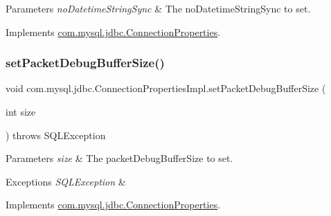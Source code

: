 \begin{DoxyParams}{Parameters}
{\em no\+Datetime\+String\+Sync} & The no\+Datetime\+String\+Sync to set. \\
\hline
\end{DoxyParams}


Implements \mbox{\hyperlink{interfacecom_1_1mysql_1_1jdbc_1_1_connection_properties_a01c8815660b50a6db2e6f89f796e3ee9}{com.\+mysql.\+jdbc.\+Connection\+Properties}}.

\mbox{\label{classcom_1_1mysql_1_1jdbc_1_1_connection_properties_impl_adbb96f1f13b761373e6fb46ac8cde113}} 
\subsubsection{\texorpdfstring{set\+Packet\+Debug\+Buffer\+Size()}{setPacketDebugBufferSize()}}
{\footnotesize\ttfamily void com.\+mysql.\+jdbc.\+Connection\+Properties\+Impl.\+set\+Packet\+Debug\+Buffer\+Size (\begin{DoxyParamCaption}\item[{int}]{size }\end{DoxyParamCaption}) throws S\+Q\+L\+Exception}


\begin{DoxyParams}{Parameters}
{\em size} & The packet\+Debug\+Buffer\+Size to set. \\
\hline
\end{DoxyParams}

\begin{DoxyExceptions}{Exceptions}
{\em S\+Q\+L\+Exception} & \\
\hline
\end{DoxyExceptions}


Implements \mbox{\hyperlink{interfacecom_1_1mysql_1_1jdbc_1_1_connection_properties_ae0414fc9a146276fb458dc6e6b423f98}{com.\+mysql.\+jdbc.\+Connection\+Properties}}.

\mbox{\label{classcom_1_1mysql_1_1jdbc_1_1_connection_properties_impl_af536d960a0f2d5e48f7b005ba212f8d7}} 
